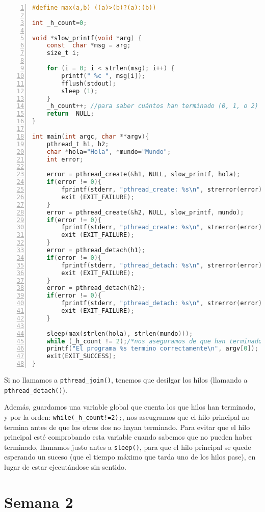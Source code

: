 \documentclass{article}
\begin{document}
\begin{lstlisting}[language=C, texcl=true, numbers=left]
#define max(a,b) ((a)>(b)?(a):(b))

int _h_count=0;

void *slow_printf(void *arg) {
    const  char *msg = arg;
    size_t i;
    
    for (i = 0; i < strlen(msg); i++) {
        printf(" %c ", msg[i]);
        fflush(stdout);
        sleep (1);
    }    
    _h_count++; //para saber cuántos han terminado (0, 1, o 2)
    return  NULL;
}

int main(int argc, char **argv){
    pthread_t h1, h2;
    char *hola="Hola", *mundo="Mundo";
    int error;

    error = pthread_create(&h1, NULL, slow_printf, hola);
    if(error != 0){
        fprintf(stderr, "pthread_create: %s\n", strerror(error));
        exit (EXIT_FAILURE);
    }
    error = pthread_create(&h2, NULL, slow_printf, mundo);
    if(error != 0){
        fprintf(stderr, "pthread_create: %s\n", strerror(error));
        exit (EXIT_FAILURE);
    }
    error = pthread_detach(h1);
    if(error != 0){ 
        fprintf(stderr, "pthread_detach: %s\n", strerror(error));
        exit (EXIT_FAILURE);
    }
    error = pthread_detach(h2);
    if(error != 0){
        fprintf(stderr, "pthread_detach: %s\n", strerror(error));
        exit (EXIT_FAILURE);
    }

    sleep(max(strlen(hola), strlen(mundo))); 
    while (_h_count != 2);/*nos aseguramos de que han terminado*/
    printf("El programa %s termino correctamente\n", argv[0]);
    exit(EXIT_SUCCESS);
}
\end{lstlisting}

Si no llamamos a \texttt{pthread\_join()}, tenemos que desilgar los hilos (llamando a \texttt{pthread\_detach()}).

Además, guardamos una variable global que cuenta los que hilos han terminado, y por la orden: \texttt{while(\_h\_count!=2);}, nos aseugramos que el hilo principal no termina antes de que los otros dos no hayan terminado. Para evitar que el hilo principal esté comprobando esta variable cuando sabemos que no pueden haber terminado, llamamos justo antes a \texttt{sleep()}, para que el hilo principal se quede esperando un suceso (que el tiempo máximo que tarda uno de los hilos pase), en lugar de estar ejecutándose sin sentido.

\section*{Semana 2}
\end{document}
